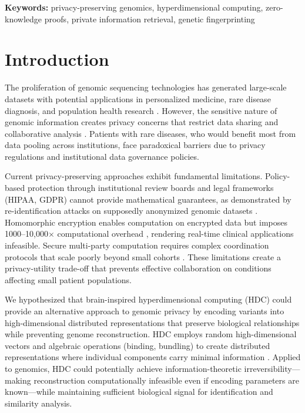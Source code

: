 \documentclass[11pt,letterpaper]{article}
\begin{document}
\noindent\textbf{Keywords:} privacy-preserving genomics, hyperdimensional computing, zero-knowledge proofs, private information retrieval, genetic fingerprinting

\section{Introduction}

The proliferation of genomic sequencing technologies has generated large-scale datasets with potential applications in personalized medicine, rare disease diagnosis, and population health research \cite{birney2021}. However, the sensitive nature of genomic information creates privacy concerns that restrict data sharing and collaborative analysis \cite{gymrek2013,erlich2014}. Patients with rare diseases, who would benefit most from data pooling across institutions, face paradoxical barriers due to privacy regulations and institutional data governance policies.

Current privacy-preserving approaches exhibit fundamental limitations. Policy-based protection through institutional review boards and legal frameworks (HIPAA, GDPR) cannot provide mathematical guarantees, as demonstrated by re-identification attacks on supposedly anonymized genomic datasets \cite{homer2008,im2012}. Homomorphic encryption enables computation on encrypted data but imposes 1000--10,000$\times$ computational overhead \cite{kim2015,chen2016}, rendering real-time clinical applications infeasible. Secure multi-party computation requires complex coordination protocols that scale poorly beyond small cohorts \cite{kamm2013}. These limitations create a privacy-utility trade-off that prevents effective collaboration on conditions affecting small patient populations.

We hypothesized that brain-inspired hyperdimensional computing (HDC) could provide an alternative approach to genomic privacy by encoding variants into high-dimensional distributed representations that preserve biological relationships while preventing genome reconstruction. HDC employs random high-dimensional vectors and algebraic operations (binding, bundling) to create distributed representations where individual components carry minimal information \cite{karunaratne2021}. Applied to genomics, HDC could potentially achieve information-theoretic irreversibility---making reconstruction computationally infeasible even if encoding parameters are known---while maintaining sufficient biological signal for identification and similarity analysis.
\end{document}
